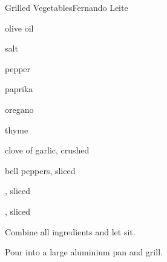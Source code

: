 \begin{recipe}{Grilled Vegetables}{Fernando Leite}{}

\begin{ingredients}
\item olive oil
\item salt
\item pepper
\item paprika
\item oregano
\item thyme
\item clove of garlic, crushed
\item bell peppers, sliced
\item {}, sliced
\item {}, sliced
\end{ingredients}

\begin{directions}
\item Combine all ingredients and let sit.
\item Pour into a large aluminium pan and grill.
\end{directions}

\end{recipe}
